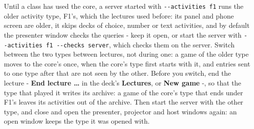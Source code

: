 \documentclass[a4paper,11pt]{article}
\begin{document}
Until a class has used the core, a server started with \texttt{-\allowbreak{}-\allowbreak{}activities\allowbreak{} f1} runs the older activity type, F1's, which the lectures used before: its panel and phone screen are older, it skips decks of choice, number or text activities, and by default the presenter window checks the queries -\allowbreak{} keep it open, or start the server with \texttt{-\allowbreak{}-\allowbreak{}activities\allowbreak{} f1 -\allowbreak{}-\allowbreak{}checks server}, which checks them on the server.\allowbreak{} Switch between the two types between lectures, not during one: a game of the older type moves to the core's once, when the core's type first starts with it, and entries sent to one type after that are not seen by the other.\allowbreak{} Before you switch, end the lecture -\allowbreak{} \textbf{End lecture …} in the deck's \textbf{Lectures}, or \textbf{New game} -\allowbreak{}, so that the type that played it writes its archive: a game of the core's type that ends under F1's leaves its activities out of the archive.\allowbreak{} Then start the server with the other type, and close and open the presenter, projector and host windows again: an open window keeps the type it was opened with.\par
\end{document}
